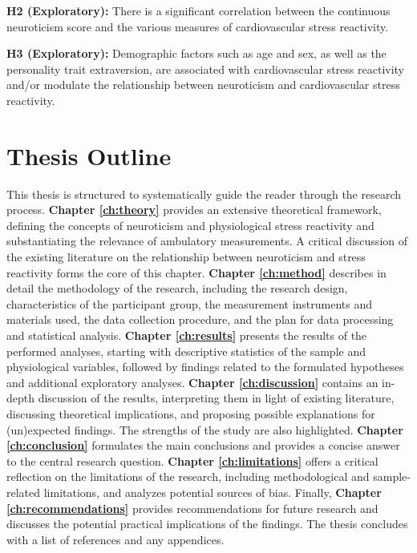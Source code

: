 \documentclass[11pt, a4paper]{report}
\begin{document}
\textbf{H2 (Exploratory):} There is a significant correlation between the continuous neuroticism score and the various measures of cardiovascular stress reactivity.

\textbf{H3 (Exploratory):} Demographic factors such as age and sex, as well as the personality trait extraversion, are associated with cardiovascular stress reactivity and/or modulate the relationship between neuroticism and cardiovascular stress reactivity.

\section{Thesis Outline} %
\label{sec:thesis_outline}

This thesis is structured to systematically guide the reader through the research process. \textbf{Chapter \ref{ch:theory}} provides an extensive theoretical framework, defining the concepts of neuroticism and physiological stress reactivity and substantiating the relevance of ambulatory measurements. A critical discussion of the existing literature on the relationship between neuroticism and stress reactivity forms the core of this chapter. \textbf{Chapter \ref{ch:method}} describes in detail the methodology of the research, including the research design, characteristics of the participant group, the measurement instruments and materials used, the data collection procedure, and the plan for data processing and statistical analysis. \textbf{Chapter \ref{ch:results}} presents the results of the performed analyses, starting with descriptive statistics of the sample and physiological variables, followed by findings related to the formulated hypotheses and additional exploratory analyses. \textbf{Chapter \ref{ch:discussion}} contains an in-depth discussion of the results, interpreting them in light of existing literature, discussing theoretical implications, and proposing possible explanations for (un)expected findings. The strengths of the study are also highlighted. \textbf{Chapter \ref{ch:conclusion}} formulates the main conclusions and provides a concise answer to the central research question. \textbf{Chapter \ref{ch:limitations}} offers a critical reflection on the limitations of the research, including methodological and sample-related limitations, and analyzes potential sources of bias. Finally, \textbf{Chapter \ref{ch:recommendations}} provides recommendations for future research and discusses the potential practical implications of the findings. The thesis concludes with a list of references and any appendices.
\end{document}
